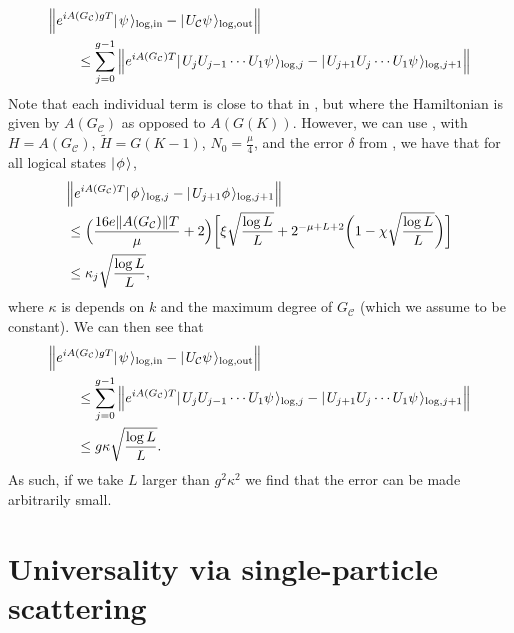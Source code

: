 \documentclass[../thesis-main/thesis-main]{subfiles}
\begin{document}
\begin{align}
  &\Big \Vert e^{ i A(G_{\mathcal{C}} )g T} |\mspace{2mu} \psi \mspace{2mu} \rangle_{\text{log},\text{in}} - |\mspace{2mu} U_{\mathcal{C}} \psi \mspace{2mu} \rangle_{\text{log},\text{out}}\Big \Vert\nonumber\\
  & \qquad \leq \sum_{j = 0}^{g-1} \Big \Vert e^{ i A(G_{\mathcal{C}})T} |\mspace{2mu} U_{j} U_{j-1}\cdots U_1 \psi \mspace{2mu} \rangle_{\text{log},j} - |\mspace{2mu} U_{j+1}U_{j} \cdots U_1 \psi \mspace{2mu} \rangle_{\text{log},j+1}\Big \Vert
\end{align}
Note that each individual term is close to that in , but where the Hamiltonian is given by $A(G_{\mathcal{C}})$ as opposed to $A(G(K))$.  However, we can use , with $H = A(G_{\mathcal{C}})$, $\tilde{H} = G(K-1)$,  $N_0 = \frac{\mu}{4}$, and the error $\delta$ from , we have that for all logical states $|\mspace{2mu} \phi \mspace{2mu} \rangle$,
\begin{align}
   &\Big \Vert e^{ i A(G_{\mathcal{C}})T} |\mspace{2mu} \phi \mspace{2mu} \rangle_{\text{log},j} - |\mspace{2mu} U_{j+1}\phi \mspace{2mu} \rangle_{\text{log},j+1}\Big \Vert\nonumber\\
   &\leq \Big(\frac{ 16 e \|{A(G_{\mathcal{C}})}\| T}{\mu} + 2\Big)\bigg[ \xi \sqrt{\frac{\log L}{L}} + 2^{- \mu + L +2} \bigg(1 -   \chi \sqrt{\frac{\log L}{L}} \bigg)\bigg]\\
   & \leq \kappa_j \sqrt{\frac{\log L}{L}},
\end{align}
where $\kappa$ is depends on $k$ and the maximum degree of $G_{\mathcal{C}}$ (which we assume to be constant).  We can then see that
\begin{align}
  &\Big \Vert e^{ i A(G_{\mathcal{C}} )g T} |\mspace{2mu} \psi \mspace{2mu} \rangle_{\text{log},\text{in}} - |\mspace{2mu} U_{\mathcal{C}} \psi \mspace{2mu} \rangle_{\text{log},\text{out}}\Big \Vert\nonumber\\
  & \qquad \leq \sum_{j = 0}^{g-1} \Big \Vert e^{ i A(G_{\mathcal{C}})T} |\mspace{2mu} U_{j} U_{j-1}\cdots U_1 \psi \mspace{2mu} \rangle_{\text{log},j} - |\mspace{2mu} U_{j+1}U_{j} \cdots U_1 \psi \mspace{2mu} \rangle_{\text{log},j+1}\Big \Vert\\
  &\qquad \leq g\kappa \sqrt{\frac{\log L}{L}}.
\end{align}
As such, if we take $L$ larger than $g^2\kappa^2$ we find that the error can be made arbitrarily small.





\section{Universality via single-particle scattering}
\end{document}
